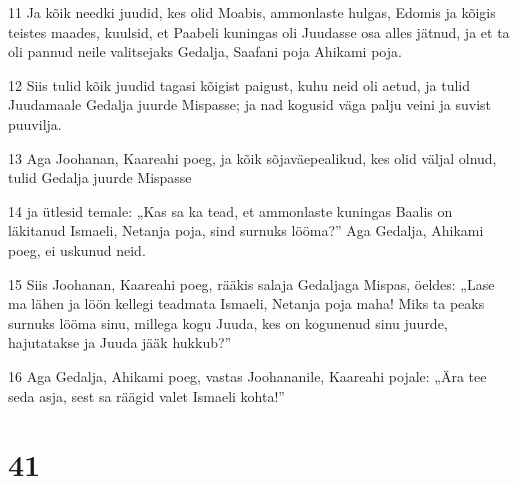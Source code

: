 \par 11 Ja kõik needki juudid, kes olid Moabis, ammonlaste hulgas, Edomis ja kõigis teistes maades, kuulsid, et Paabeli kuningas oli Juudasse osa alles jätnud, ja et ta oli pannud neile valitsejaks Gedalja, Saafani poja Ahikami poja.
\par 12 Siis tulid kõik juudid tagasi kõigist paigust, kuhu neid oli aetud, ja tulid Juudamaale Gedalja juurde Mispasse; ja nad kogusid väga palju veini ja suvist puuvilja.
\par 13 Aga Joohanan, Kaareahi poeg, ja kõik sõjaväepealikud, kes olid väljal olnud, tulid Gedalja juurde Mispasse
\par 14 ja ütlesid temale: „Kas sa ka tead, et ammonlaste kuningas Baalis on läkitanud Ismaeli, Netanja poja, sind surnuks lööma?” Aga Gedalja, Ahikami poeg, ei uskunud neid.
\par 15 Siis Joohanan, Kaareahi poeg, rääkis salaja Gedaljaga Mispas, öeldes: „Lase ma lähen ja löön kellegi teadmata Ismaeli, Netanja poja maha! Miks ta peaks surnuks lööma sinu, millega kogu Juuda, kes on kogunenud sinu juurde, hajutatakse ja Juuda jääk hukkub?”
\par 16 Aga Gedalja, Ahikami poeg, vastas Joohananile, Kaareahi pojale: „Ära tee seda asja, sest sa räägid valet Ismaeli kohta!”

\chapter{41}


